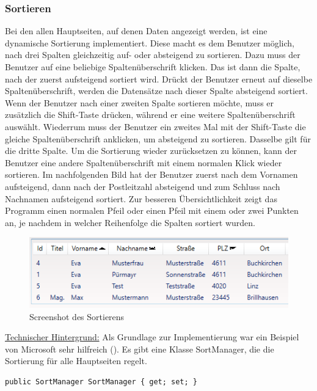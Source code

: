 \subsubsection{Sortieren}
Bei den allen Hauptseiten, auf denen Daten angezeigt werden, ist eine dynamische Sortierung implementiert. Diese macht es dem Benutzer möglich, nach drei Spalten gleichzeitig auf- oder absteigend zu sortieren.  Dazu muss der Benutzer auf eine beliebige Spaltenüberschrift klicken. Das ist dann die Spalte, nach der zuerst aufsteigend sortiert wird. Drückt der Benutzer erneut auf dieselbe Spaltenüberschrift, werden die Datensätze nach dieser Spalte absteigend sortiert. Wenn der Benutzer nach einer zweiten Spalte sortieren möchte, muss er zusätzlich die Shift-Taste drücken, während er eine weitere Spaltenüberschrift auswählt. Wiederrum muss der Benutzer ein zweites Mal mit der Shift-Taste die gleiche Spaltenüberschrift anklicken, um absteigend zu sortieren. Dasselbe gilt für die dritte Spalte. Um die Sortierung wieder zurücksetzen zu können, kann der Benutzer eine andere Spaltenüberschrift mit einem normalen Klick wieder sortieren. Im nachfolgenden Bild hat der Benutzer zuerst nach dem Vornamen aufsteigend, dann nach der Postleitzahl absteigend und zum Schluss nach Nachnamen aufsteigend sortiert. Zur besseren Übersichtlichkeit zeigt das Programm einen normalen Pfeil oder einen Pfeil mit einem oder zwei Punkten an, je nachdem in welcher Reihenfolge die Spalten sortiert wurden.
\begin{figure}[H]
\begin{center}
	\includegraphics[scale=0.9]{images/Sortieren.png}
\end{center}
	\caption{Screenshot des Sortierens}
	\label{fig:sample}
\end{figure}
\noindent \underline{Technischer Hintergrund:} \linebreak
Als Grundlage zur Implementierung war ein Beispiel von Microsoft sehr hilfreich \linebreak (\cite{microsoft_windows_2017}). \newline Es gibt eine Klasse SortManager, die die Sortierung für alle Hauptseiten regelt.
\begin{lstlisting}
public SortManager SortManager { get; set; }
\end{lstlisting} 
